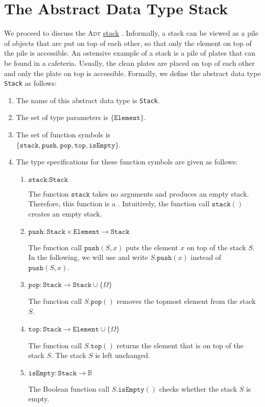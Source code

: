 \section{The Abstract Data Type Stack}
We proceed to discuss the \textsc{Adt} \href{https://en.wikipedia.org/wiki/Stack_(abstract_data_type)}{stack} 
. 
Informally, a stack can be viewed as a pile of objects that are put on top of each other, so that
only the element on top of the pile is accessible.  An ostensive example of a stack is a pile of
plates that can be found in a cafeteria.  Usually, the clean plates are placed on top of each other
and only the plate on top is accessible.  Formally, we define the abstract data type
\texttt{Stack} as follows: 
\begin{enumerate}
\item The name of this abstract data type is \texttt{Stack}.
\item The set of type parameters is $\{ \texttt{Element} \}$.
\item The set of function symbols is \\[0.2cm]
      \hspace*{1.3cm} 
      $\bigl\{ \texttt{stack}, \texttt{push}, \texttt{pop}, \texttt{top}, \texttt{isEmpty} \bigr\}$.
\item The type specifications for these function symbols are given as follows:
      \begin{enumerate}
      \item $\texttt{stack}: \texttt{Stack}$

            The function $\texttt{stack}$ takes no arguments and produces an empty stack.
            Therefore, this function is a .  Intuitively, the function call $\texttt{stack}()$ 
            creates an empty stack.
      \item $\texttt{push}: \texttt{Stack} \times \texttt{Element} \rightarrow \texttt{Stack}$

            The function call $\texttt{push}(S,x)$ puts the element $x$ on top of the stack $S$.  In
            the following, we will use 
            and write $S.\texttt{push}(x)$ instead of $\texttt{push}(S,x)$.
      \item $\texttt{pop}: \texttt{Stack}  \rightarrow \texttt{Stack} \cup \{ \Omega \}$

            The function call $S.\texttt{pop}()$ removes the topmost element from the stack $S$.
      \item $\texttt{top}: \texttt{Stack} \rightarrow \texttt{Element} \cup \{ \Omega \}$

            The function call $S.\texttt{top}()$ returns the element that is on top of the stack $S$. 
            The stack $S$ is left unchanged.
     \item $\texttt{isEmpty}: \texttt{Stack} \rightarrow \mathbb{B}$

            The Boolean function call $S.\texttt{isEmpty}()$ checks whether the stack $S$ is empty.
      \end{enumerate}
\end{enumerate}
